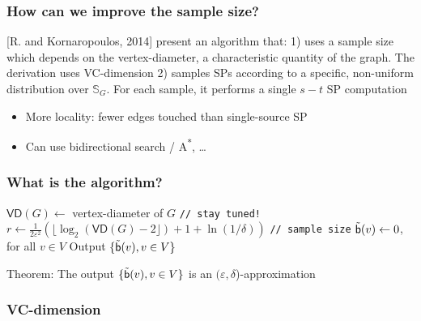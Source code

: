 \begin{frame}
  \frametitle{How can we improve the sample size?}
  [R. and Kornaropoulos, 2014] present an algorithm that:
  \vfill
  1) uses a sample size which depends on the vertex-diameter, a characteristic
  quantity of the graph. The derivation uses VC-dimension
  \vfill
  2) samples SPs according to a specific, non-uniform distribution over
  $\mathbb{S}_G$. For each sample, it performs a single $s-t$ SP computation
  \begin{itemize}
    \item More locality: fewer edges touched than single-source SP
    \item Can use bidirectional search / A\textsuperscript{*},
      \ldots
  \end{itemize}
\end{frame}

\begin{frame}
  \frametitle{What is the algorithm?}
  \begin{algorithm}[H]
    \DontPrintSemicolon
    $\mathsf{VD}(G)\leftarrow$ vertex-diameter of $G$ \texttt{// stay
    tuned!}\;
    $r\leftarrow\frac{1}{2\varepsilon^2}\left(\lfloor\log_2(\mathsf{VD}(G)-2\rfloor)
    +1 + \ln(1/\delta)\right)$ \texttt{// sample size}\;
    $\tilde{\mathsf{b}}(v)\leftarrow 0$, for all $v\in V$\;
    Output $\{\tilde{\mathsf{b}}(v), v\in V\}$
  \end{algorithm}
  Theorem: The output $\{\tilde{\mathsf{b}}(v), v\in V\}$ is an
  $(\varepsilon,\delta$)-approximation
\end{frame}

\begin{frame}
  \frametitle{VC-dimension}
\end{frame}

